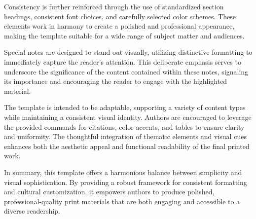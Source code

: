 \documentclass[10pt,a4paper,twoside,twocolumn,openany]{book}
\newlength{\mytopmargin}
\newlength{\mysidemargin}
\newlength{\mycolumnspace}
\begin{document}
    Consistency is further reinforced through the use of standardized section headings, consistent font choices, and carefully selected color schemes. These elements work in harmony to create a polished and professional appearance, making the template suitable for a wide range of subject matter and audiences.
    
    Special notes are designed to stand out visually, utilizing distinctive formatting to immediately capture the reader's attention. This deliberate emphasis serves to underscore the significance of the content contained within these notes, signaling its importance and encouraging the reader to engage with the highlighted material.
    
    The template is intended to be adaptable, supporting a variety of content types while maintaining a consistent visual identity. Authors are encouraged to leverage the provided commands for citations, color accents, and tables to ensure clarity and uniformity. The thoughtful integration of thematic elements and visual cues enhances both the aesthetic appeal and functional readability of the final printed work.
    
    In summary, this template offers a harmonious balance between simplicity and visual sophistication. By providing a robust framework for consistent formatting and cultural customization, it empowers authors to produce polished, professional-quality print materials that are both engaging and accessible to a diverse readership.
    
    \pagebreak
    
\newpage

\vspace{-40pt} %
\end{document}
